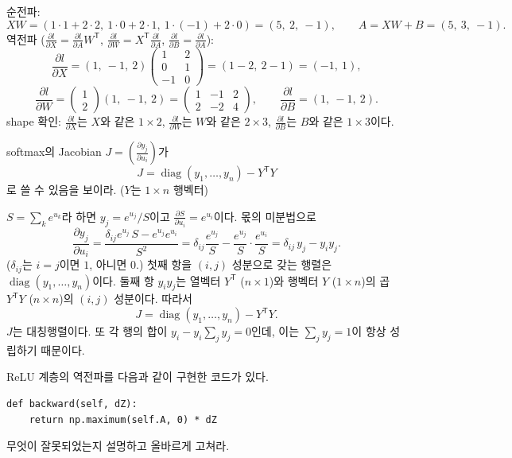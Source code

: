 \documentclass[11pt,a4paper]{article}
\newcommand{\T}{^{\mathsf T}}
\newcommand{\pd}[2]{\frac{\partial #1}{\partial #2}}
\begin{document}
\begin{problems}
\begin{sol}
순전파:
\[
XW=(1\cdot1+2\cdot2,\ 1\cdot0+2\cdot1,\ 1\cdot(-1)+2\cdot0)=(5,\ 2,\ -1),\qquad
A=XW+B=\boxed{(5,\ 3,\ -1)}.
\]
역전파 ($\pd{l}{X}=\pd{l}{A}W\T$, $\pd{l}{W}=X\T\pd{l}{A}$, $\pd{l}{B}=\pd{l}{A}$):
\[
\pd{l}{X}=(1,\ -1,\ 2)\begin{pmatrix}1&2\\0&1\\-1&0\end{pmatrix}
=(1-2,\ 2-1)=\boxed{(-1,\ 1)},
\]
\[
\pd{l}{W}=\begin{pmatrix}1\\2\end{pmatrix}(1,\ -1,\ 2)
=\boxed{\begin{pmatrix}1&-1&2\\2&-2&4\end{pmatrix}},\qquad
\pd{l}{B}=\boxed{(1,\ -1,\ 2)}.
\]
shape 확인: $\pd{l}{X}$는 $X$와 같은 $1\times2$, $\pd{l}{W}$는 $W$와 같은 $2\times3$, $\pd{l}{B}$는 $B$와 같은 $1\times3$이다.
\end{sol}

\item softmax의 Jacobian $J=\left(\pd{y_j}{u_i}\right)$가
\[
J=\operatorname{diag}(y_1,\ldots,y_n)-Y\T Y
\]
로 쓸 수 있음을 보이라. ($Y$는 $1\times n$ 행벡터)

\begin{sol}
$S=\sum_k e^{u_k}$라 하면 $y_j=e^{u_j}/S$이고 $\pd{S}{u_i}=e^{u_i}$이다.
몫의 미분법으로
\[
\pd{y_j}{u_i}
=\frac{\delta_{ij}e^{u_j}\,S-e^{u_j}e^{u_i}}{S^2}
=\delta_{ij}\frac{e^{u_j}}{S}-\frac{e^{u_j}}{S}\cdot\frac{e^{u_i}}{S}
=\delta_{ij}\,y_j-y_iy_j .
\]
($\delta_{ij}$는 $i=j$이면 $1$, 아니면 $0$.)
첫째 항을 $(i,j)$ 성분으로 갖는 행렬은 $\operatorname{diag}(y_1,\ldots,y_n)$이다.
둘째 항 $y_iy_j$는 열벡터 $Y\T$ ($n\times1$)와 행벡터 $Y$ ($1\times n$)의 곱 $Y\T Y$ ($n\times n$)의 $(i,j)$ 성분이다. 따라서
\[
J=\operatorname{diag}(y_1,\ldots,y_n)-Y\T Y .
\]
$J$는 대칭행렬이다. 또 각 행의 합이 $y_i-y_i\sum_jy_j=0$인데, 이는 $\sum_jy_j=1$이 항상 성립하기 때문이다.
\end{sol}

\item ReLU 계층의 역전파를 다음과 같이 구현한 코드가 있다.
\begin{lstlisting}[numbers=none]
def backward(self, dZ):
    return np.maximum(self.A, 0) * dZ
\end{lstlisting}
무엇이 잘못되었는지 설명하고 올바르게 고쳐라.


\end{problems}
\end{document}
